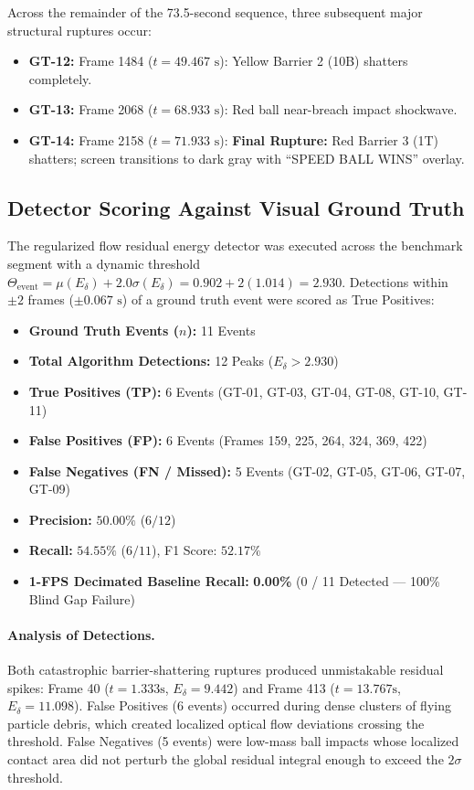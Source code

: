 \documentclass[11pt]{article}
\begin{document}
Across the remainder of the 73.5-second sequence, three subsequent major structural ruptures occur:
\begin{itemize}
    \item \textbf{GT-12:} Frame 1484 ($t = 49.467\text{ s}$): Yellow Barrier 2 (10B) shatters completely.
    \item \textbf{GT-13:} Frame 2068 ($t = 68.933\text{ s}$): Red ball near-breach impact shockwave.
    \item \textbf{GT-14:} Frame 2158 ($t = 71.933\text{ s}$): \textbf{Final Rupture:} Red Barrier 3 (1T) shatters; screen transitions to dark gray with ``SPEED BALL WINS'' overlay.
\end{itemize}

\subsection{Detector Scoring Against Visual Ground Truth}

The regularized flow residual energy detector was executed across the benchmark segment with a dynamic threshold $\Theta_{\text{event}} = \mu(E_\delta) + 2.0\sigma(E_\delta) = 0.902 + 2(1.014) = \mathbf{2.930}$. Detections within $\pm 2$ frames ($\pm 0.067\text{ s}$) of a ground truth event were scored as True Positives:
\begin{itemize}
    \item \textbf{Ground Truth Events ($n$):} 11 Events
    \item \textbf{Total Algorithm Detections:} 12 Peaks ($E_\delta > 2.930$)
    \item \textbf{True Positives (TP):} 6 Events (GT-01, GT-03, GT-04, GT-08, GT-10, GT-11)
    \item \textbf{False Positives (FP):} 6 Events (Frames 159, 225, 264, 324, 369, 422)
    \item \textbf{False Negatives (FN / Missed):} 5 Events (GT-02, GT-05, GT-06, GT-07, GT-09)
    \item \textbf{Precision:} $50.00\%$ ($6 / 12$)
    \item \textbf{Recall:} $54.55\%$ ($6 / 11$), F1 Score: $52.17\%$
    \item \textbf{1-FPS Decimated Baseline Recall:} \textbf{0.00\%} (0 / 11 Detected --- 100\% Blind Gap Failure)
\end{itemize}

\paragraph{Analysis of Detections.} Both catastrophic barrier-shattering ruptures produced unmistakable residual spikes: Frame 40 ($t=1.333\text{s}$, $E_\delta = 9.442$) and Frame 413 ($t=13.767\text{s}$, $E_\delta = 11.098$). False Positives (6 events) occurred during dense clusters of flying particle debris, which created localized optical flow deviations crossing the threshold. False Negatives (5 events) were low-mass ball impacts whose localized contact area did not perturb the global residual integral enough to exceed the $2\sigma$ threshold.
\end{document}

